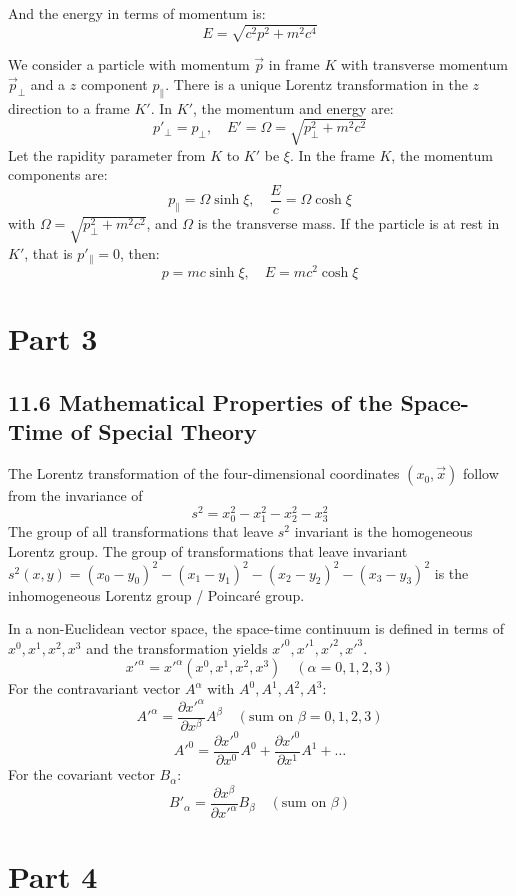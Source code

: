 \documentclass{article}
\begin{document}
	And the energy in terms of momentum is:
	$$ E = \sqrt{c^2p^2 + m^2c^4} $$
	
	We consider a particle with momentum $\vec{p}$ in frame $K$ with transverse momentum $\vec{p}_\perp$ and a $z$ component $p_\parallel$. There is a unique Lorentz transformation in the $z$ direction to a frame $K'$.
	In $K'$, the momentum and energy are:
	$$ p'_\perp = p_\perp, \quad E' = \Omega = \sqrt{p_\perp^2 + m^2c^2} $$
	Let the rapidity parameter from $K$ to $K'$ be $\xi$.
	In the frame $K$, the momentum components are:
	$$ p_\parallel = \Omega \sinh\xi, \quad \frac{E}{c} = \Omega \cosh\xi $$
	with $\Omega = \sqrt{p_\perp^2 + m^2c^2}$, and $\Omega$ is the transverse mass.
	If the particle is at rest in $K'$, that is $p'_\parallel = 0$, then:
	$$ p = mc \sinh\xi, \quad E = mc^2 \cosh\xi $$
	
	\section*{Part 3}
	
	\subsection*{11.6 Mathematical Properties of the Space-Time of Special Theory}
	
	The Lorentz transformation of the four-dimensional coordinates $(x_0, \vec{x})$ follow from the invariance of
	$$ s^2 = x_0^2 - x_1^2 - x_2^2 - x_3^2 $$
	The group of all transformations that leave $s^2$ invariant is the homogeneous Lorentz group.
	The group of transformations that leave invariant $s^2(x, y) = (x_0 - y_0)^2 - (x_1 - y_1)^2 - (x_2 - y_2)^2 - (x_3 - y_3)^2$ is the inhomogeneous Lorentz group / Poincaré group.
	
	In a non-Euclidean vector space, the space-time continuum is defined in terms of $x^0, x^1, x^2, x^3$ and the transformation yields $x'^0, x'^1, x'^2, x'^3$.
	$$ x'^\alpha = x'^\alpha(x^0, x^1, x^2, x^3) \quad (\alpha=0,1,2,3) $$
	For the contravariant vector $A^\alpha$ with $A^0, A^1, A^2, A^3$:
	$$ A'^\alpha = \frac{\partial x'^\alpha}{\partial x^\beta} A^\beta \quad (\text{sum on } \beta=0,1,2,3) $$
	$$ A'^0 = \frac{\partial x'^0}{\partial x^0} A^0 + \frac{\partial x'^0}{\partial x^1} A^1 + \dots $$
	For the covariant vector $B_\alpha$:
	$$ B'_\alpha = \frac{\partial x^\beta}{\partial x'^\alpha} B_\beta \quad (\text{sum on } \beta) $$
	
	\section*{Part 4}
	
\end{document}
